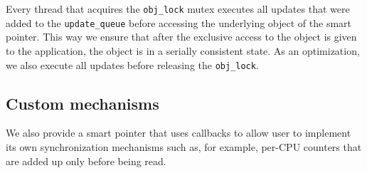 Every thread that acquires the {\tt obj\_lock} mutex executes all updates that were added to the {\tt update\_queue} before accessing the underlying object of the smart pointer. This way we ensure that after the exclusive access to the object is given to the application, the object is in a serially consistent state. As an optimization, we also execute all updates before releasing the {\tt obj\_lock}.

\subsection{Custom mechanisms}

We also provide a smart pointer that uses callbacks to allow user to implement its own synchronization mechanisms such as, for example, per-CPU counters that are added up only before being read.
